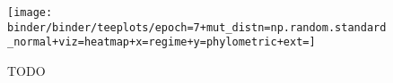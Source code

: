\begin{figure*}
  \centering
  \texttt{[image: binder/binder/teeplots/epoch=7+mut\_distn=np.random.standard\_normal+viz=heatmap+x=regime+y=phylometric+ext=]}
  \caption{TODO}
  \label{fig:perfect-tree-phylometrics-heatmap}
\end{figure*}
